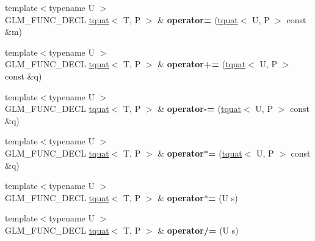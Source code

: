 \begin{DoxyCompactItemize}
\item 
\mbox{\label{structglm_1_1tquat_af00985afe704157487281c4c3eb4f790}} 
{\footnotesize template$<$typename U $>$ }\\G\+L\+M\+\_\+\+F\+U\+N\+C\+\_\+\+D\+E\+CL \hyperlink{structglm_1_1tquat}{tquat}$<$ T, P $>$ \& {\bfseries operator=} (\hyperlink{structglm_1_1tquat}{tquat}$<$ U, P $>$ const \&m)
\item 
\mbox{\label{structglm_1_1tquat_a6a659798636ad7f9d8cb392904b61020}} 
{\footnotesize template$<$typename U $>$ }\\G\+L\+M\+\_\+\+F\+U\+N\+C\+\_\+\+D\+E\+CL \hyperlink{structglm_1_1tquat}{tquat}$<$ T, P $>$ \& {\bfseries operator+=} (\hyperlink{structglm_1_1tquat}{tquat}$<$ U, P $>$ const \&q)
\item 
\mbox{\label{structglm_1_1tquat_aae515aeb43cddd4074a27a74aa516475}} 
{\footnotesize template$<$typename U $>$ }\\G\+L\+M\+\_\+\+F\+U\+N\+C\+\_\+\+D\+E\+CL \hyperlink{structglm_1_1tquat}{tquat}$<$ T, P $>$ \& {\bfseries operator-\/=} (\hyperlink{structglm_1_1tquat}{tquat}$<$ U, P $>$ const \&q)
\item 
\mbox{\label{structglm_1_1tquat_a3aaba279045f689985499e21aafd1ab8}} 
{\footnotesize template$<$typename U $>$ }\\G\+L\+M\+\_\+\+F\+U\+N\+C\+\_\+\+D\+E\+CL \hyperlink{structglm_1_1tquat}{tquat}$<$ T, P $>$ \& {\bfseries operator$\ast$=} (\hyperlink{structglm_1_1tquat}{tquat}$<$ U, P $>$ const \&q)
\item 
\mbox{\label{structglm_1_1tquat_ac92bf2dc48e2c7e3f4976b25a5daf78a}} 
{\footnotesize template$<$typename U $>$ }\\G\+L\+M\+\_\+\+F\+U\+N\+C\+\_\+\+D\+E\+CL \hyperlink{structglm_1_1tquat}{tquat}$<$ T, P $>$ \& {\bfseries operator$\ast$=} (U s)
\item 
\mbox{\label{structglm_1_1tquat_ab9348510c32247974addf29b37304b2b}} 
{\footnotesize template$<$typename U $>$ }\\G\+L\+M\+\_\+\+F\+U\+N\+C\+\_\+\+D\+E\+CL \hyperlink{structglm_1_1tquat}{tquat}$<$ T, P $>$ \& {\bfseries operator/=} (U s)
\item 

\end{DoxyCompactItemize}
